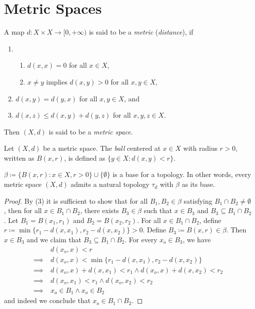 \documentclass[screen]{techreport}
\numberwithin{equation}{section}
\begin{document}
\section{Metric Spaces}

\begin{definition}\label{De:Metrics}
	A map $d : X \times X \to [0,+\infty)$ is said to be a \emph{metric} (\emph{distance}), if
	\begin{enumerate}
		\item\
		\begin{enumerate}
			\item $d(x,x) = 0$ for all $x \in X$,
			\item $x \neq y$ implies $d(x,y) > 0$ for all $x,y \in X$,
		\end{enumerate}
		\item $d(x,y) = d(y,x)$ for all $x,y \in X$, and
		\item $d(x,z) \le d(x,y) + d(y,z)$ for all $x,y,z \in X$.
	\end{enumerate}
	Then $(X,d)$ is said to be a \emph{metric space}.
\end{definition}

\begin{definition}\label{De:OpenBalls}
	Let $(X,d)$ be a metric space.
	The \emph{ball} centered at $x \in X$ with radius $r > 0$, written as $B(x,r)$, is defined as $\{ y \in X : d(x,y) < r\}$.
\end{definition}

\begin{lemma}\label{Lem:MetricInduceTop}
	$\beta \coloneqq \{ B(x,r) : x \in X, r > 0 \} \cup \{ \emptyset \}$ is a base for a topology.
	In other words, every metric space $(X,d)$ admits a natural topology $\tau_d$ with $\beta$ as its base.
\end{lemma}
\begin{proof}
	By (3) it is sufficient to show that for all $B_1,B_2 \in \beta$ satisfying $B_1 \cap B_2 \neq \emptyset$, then for all $x \in B_1 \cap B_2$, there exists $B_3 \in \beta$ such that $x \in B_3$ and $B_3 \subseteq B_1 \cap B_2$.
	Let $B_1 = B(x_1,r_1)$ and $B_2 = B(x_2,r_2)$.
	For all $x \in B_1 \cap B_2$, define $r \coloneqq \min \{ r_1 - d(x,x_1), r_2 - d(x,x_2) \} > 0$.
	Define $B_3 \coloneqq B(x,r) \in \beta$.
	Then $x \in B_3$ and we claim that $B_3 \subseteq B_1 \cap B_2$.
	For every $x_o \in B_3$, we have
	\begin{align}
		& d(x_o,x) < r \\
		\implies~ & d(x_o,x) < \min \{ r_1 - d(x,x_1), r_2 - d(x,x_2) \} \\
		\implies~ & d(x_o,x) + d(x,x_1) < r_1 \wedge d(x_o,x)+d(x,x_2) < r_2 \\
		\implies~ & d(x_o,x_1) < r_1 \wedge d(x_o,x_2) < r_2 \\
		\implies~ & x_o \in B_1 \wedge x_o \in B_2
	\end{align}
	and indeed we conclude that $x_o \in B_1 \cap B_2$.
\end{proof}
\end{document}
